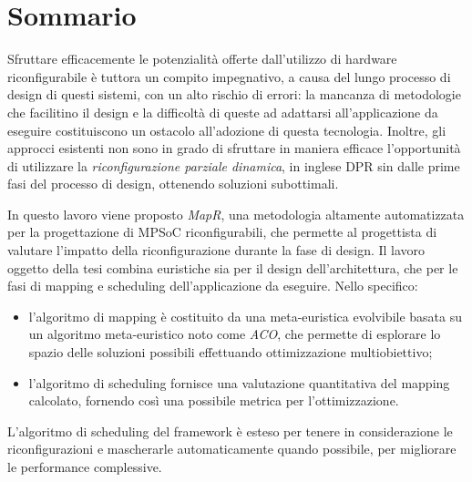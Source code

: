 \chapter*{Sommario}
\vspace{0.5cm}
Sfruttare efficacemente le potenzialit\`a offerte dall'utilizzo di hardware riconfigurabile
\`e tuttora un compito impegnativo, a causa del lungo processo di design di questi sistemi,
con un alto rischio di errori: la mancanza di metodologie che facilitino il design e
la difficolt\`a di queste ad adattarsi all'applicazione da eseguire costituiscono
un ostacolo all'adozione di questa tecnologia.
Inoltre, gli approcci esistenti non sono in grado di sfruttare in maniera efficace
l'opportunit\`a di utilizzare la \emph{riconfigurazione parziale dinamica}, in inglese
\ac{DPR} sin dalle prime fasi del processo di design, ottenendo soluzioni subottimali.

In questo lavoro viene proposto \emph{MapR}, una metodologia
altamente automatizzata per la progettazione di \acs{MPSoC} riconfigurabili, che permette
al progettista di valutare l'impatto della riconfigurazione durante la fase di design.
Il lavoro oggetto della tesi combina euristiche sia per il design dell'architettura, che per
le fasi di mapping e scheduling dell'applicazione da eseguire.
Nello specifico:
\begin{itemize}
  \item l'algoritmo di mapping \`e costituito da una meta-euristica evolvibile basata su un
    algoritmo meta-euristico noto come \emph{\ac{ACO}}, che permette di esplorare lo spazio delle
    soluzioni possibili effettuando ottimizzazione multiobiettivo;
  \item l'algoritmo di scheduling fornisce una valutazione quantitativa del mapping calcolato,
    fornendo cos\`i una possibile metrica per l'ottimizzazione.
\end{itemize}
L'algoritmo di scheduling del framework \`e esteso per tenere in considerazione
le riconfigurazioni e mascherarle automaticamente quando possibile, per migliorare le
performance complessive.

